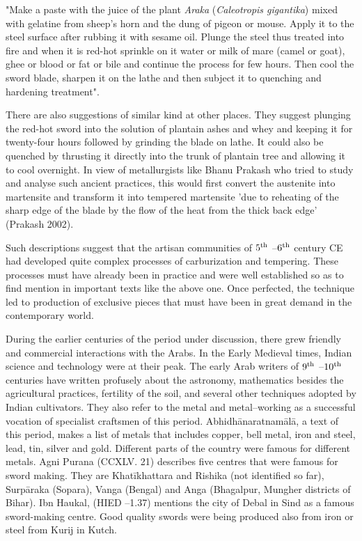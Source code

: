 "Make a paste with the juice of the plant {\it Araka} ({\it Caleotropis gigantika}) mixed with gelatine from sheep's horn and the dung of pigeon or mouse. Apply it to the steel surface after rubbing it with sesame oil. Plunge the steel thus treated into fire and when it is red-hot sprinkle on it water or milk of mare (camel or goat), ghee or blood or fat or bile and continue the process for few hours. Then cool the sword blade, sharpen it on the lathe and then subject it to quenching and hardening treatment".

There are also suggestions of similar kind at other places. They suggest plunging the red-hot sword into the solution of plantain ashes and whey and keeping it for twenty-four hours followed by grinding the blade on lathe. It could also be quenched by thrusting it directly into the trunk of plantain tree and allowing it to cool overnight. In view of metallurgists like Bhanu Prakash who tried to study and analyse such ancient practices, this would first convert the austenite into martensite and transform it into tempered martensite 'due to reheating of the sharp edge of the blade by the flow of the heat from the thick back edge' (Prakash 2002).

Such descriptions suggest that the artisan communities of $5^{\rm th}$ –$6^{\rm th}$ century CE had developed quite complex processes of carburization and tempering. These processes must have already been in practice and were well established so as to find mention in important texts like the above one. Once perfected, the technique led to production of exclusive pieces that must have been in great demand in the contemporary world. 

During the earlier centuries of the period under discussion, there grew friendly and commercial interactions with the Arabs. In the Early Medieval times, Indian science and technology were at their peak. The early Arab writers of $9^{\rm th}$ –$10^{\rm th}$ centuries have written profusely about the astronomy, mathematics besides the agricultural practices, fertility of the soil, and several other techniques adopted by Indian cultivators. They also refer to the metal and metal–working as a successful vocation of specialist craftsmen of this period. Abhidhānaratnamālā, a text of this period, makes a list of metals that includes copper, bell metal, iron and steel, lead, tin, silver and gold. Different parts of the country were famous for different metals. Agni Purana (CCXLV. 21) describes five centres that were famous for sword making. They are Khatīkhattara and Rishika (not identified so far), Surpāraka (Sopara), Vanga (Bengal) and Anga (Bhagalpur, Mungher districts of Bihar). Ibn Haukal, (HIED –1.37) mentions the city of Debal in Sind as a famous sword-making centre. Good quality swords were being produced also from iron or steel from Kurij in Kutch. 

